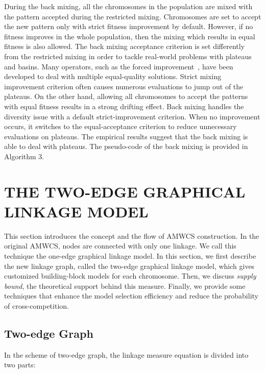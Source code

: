 \documentclass{sig-alternate-05-2015}
\begin{document}
During the back mixing, all the chromosomes in the population are mixed with the pattern accepted during the restricted mixing. Chromosomes are set to accept the new pattern only with strict fitness improvement by default. However, if no fitness improves in the whole population, then the mixing which results in equal fitness is also allowed. The back mixing acceptance criterion is set differently from the restricted mixing in order to tackle real-world problems with plateaus and basins. Many operators, such as the forced improvement~\cite{bosman:LT-GOMEA}, have been developed to deal with multiple equal-quality solutions. Strict mixing improvement criterion often causes numerous evaluations to jump out of the plateaus. On the other hand, allowing all chromosomes to accept the patterns with equal fitness results in a strong drifting effect. Back mixing handles the diversity issue with a default strict-improvement criterion. When no improvement occurs, it switches to the equal-acceptance criterion to reduce unnecessary evaluations on plateaus. The empirical results suggest that the back mixing is able to deal with plateaus. The pseudo-code of the back mixing is provided in Algorithm 3. 







\section{THE TWO-EDGE GRAPHICAL LINKAGE MODEL}
This section introduces the concept and the flow of AMWCS construction. In the original AMWCS, nodes are connected with only one linkage. We call this technique the one-edge graphical linkage model. In this section, we first describe the new linkage graph, called the two-edge graphical linkage model, which gives customized building-block models for each chromosome. Then, we discuss \textit{supply bound}, the theoretical support behind this measure. Finally, we provide some techniques that enhance the model selection efficiency and reduce the probability of cross-competition. 

\subsection{Two-edge Graph}
In the scheme of two-edge graph, the linkage measure equation is divided into two parts:
\end{document}
